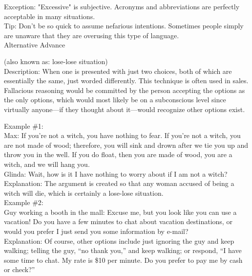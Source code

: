 \documentclass[a4paper,12pt,single,pdftex]{scrartcl}
\begin{document}
    
      Exception: "Excessive" is subjective. Acronyms and abbreviations are perfectly acceptable in many situations.
    \\

    
      Tip: Don't be so quick to assume nefarious intentions. Sometimes people simply are unaware that they are overusing this type of language.
    \\

  

Alternative Advance
    
      (also known as: lose-lose situation)
    \\

  
    Description: When one is presented with just two choices, both of which are essentially the same, just worded differently.  This technique is often used in sales.  Fallacious reasoning would be committed by the person accepting the options as the only options, which would most likely be on a subconscious level since virtually anyone—if they thought about it—would recognize other options exist.

    
      Example \#1:
    \\

    
      Max: If you’re not a witch, you have nothing to fear.  If you’re not a witch, you are not made of wood; therefore, you will sink and drown after we tie you up and throw you in the well.  If you do float, then you are made of wood, you are a witch, and we will hang you.
    \\

    
      Glinda: Wait, how is it I have nothing to worry about if I am not a witch?
    \\

    
      Explanation: The argument is created so that any woman accused of being a witch will die, which is certainly a lose-lose situation.
    \\

    
      Example \#2:
    \\

    
      Guy working a booth in the mall: Excuse me, but you look like you can use a vacation!  Do you have a few minutes to chat about vacation destinations, or would you prefer I just send you some information by e-mail?
    \\

    
      Explanation: Of course, other options include just ignoring the guy and keep walking; telling the guy, “no thank you,” and keep walking; or respond, “I have some time to chat. My rate is \$10 per minute. Do you prefer to pay me by cash or check?”
    \\
\end{document}
